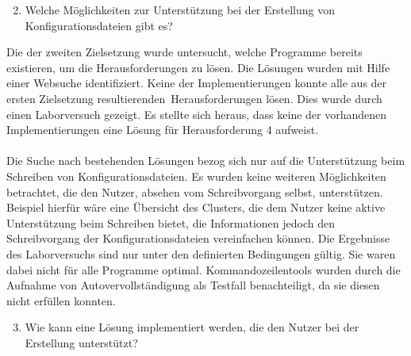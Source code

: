 \begin{enumerate}
    \setcounter{enumi}{1}
    \item Welche Möglichkeiten zur Unterstützung bei der Erstellung von Konfigurationsdateien gibt es?
\end{enumerate}

Die der zweiten Zielsetzung wurde untersucht, welche Programme bereits existieren, um die Herausforderungen zu lösen.
Die Lösungen wurden mit Hilfe einer Websuche identifiziert.
Keine der Implementierungen konnte alle aus der ersten Zielsetzung resultierenden\ Herausforderungen lösen.
Dies wurde durch einen Laborversuch gezeigt.
Es stellte sich heraus, dass keine der vorhandenen Implementierungen eine Lösung für Herausforderung 4 aufweist.
\\\\
Die Suche nach bestehenden Lösungen bezog sich nur auf die Unterstützung beim Schreiben von Konfigurationsdateien.
Es wurden keine weiteren Möglichkeiten betrachtet, die den Nutzer, absehen vom Schreibvorgang selbst, unterstützen.
Beispiel hierfür wäre eine Übersicht des Clusters, die dem Nutzer keine aktive Unterstützung beim Schreiben bietet,
die Informationen jedoch den Schreibvorgang der Konfigurationsdateien vereinfachen können.
Die Ergebnisse des Laborversuchs sind nur unter den definierten Bedingungen gültig.
Sie waren dabei nicht für alle Programme optimal. Kommandozeilentools wurden durch die Aufnahme von Autovervollständigung als Testfall benachteiligt,
da sie diesen nicht erfüllen konnten.

\begin{enumerate}
    \setcounter{enumi}{2}
    \item Wie kann eine Lösung implementiert werden, die den Nutzer bei der Erstellung unterstützt?
\end{enumerate}

